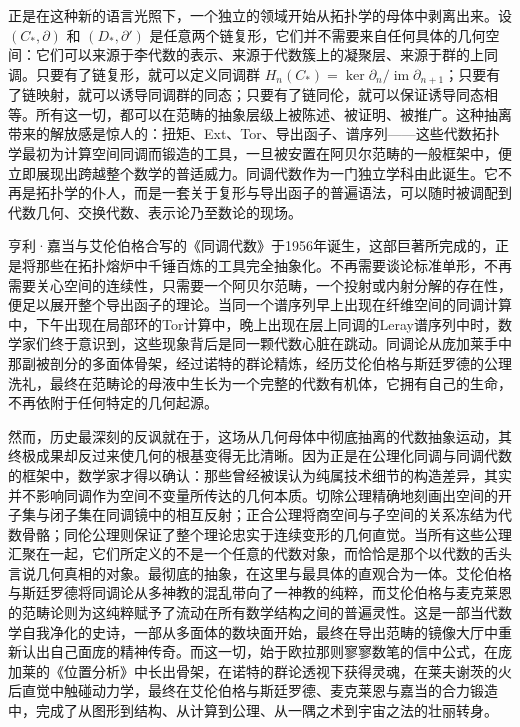 \documentclass[12pt,a4paper]{article}
\begin{document}
正是在这种新的语言光照下，一个独立的领域开始从拓扑学的母体中剥离出来。设 $(C_*, \partial)$ 和 $(D_*, \partial')$ 是任意两个链复形，它们并不需要来自任何具体的几何空间：它们可以来源于李代数的表示、来源于代数簇上的凝聚层、来源于群的上同调。只要有了链复形，就可以定义同调群 $H_n(C_*) = \ker \partial_n / \operatorname{im} \partial_{n+1}$；只要有了链映射，就可以诱导同调群的同态；只要有了链同伦，就可以保证诱导同态相等。所有这一切，都可以在范畴的抽象层级上被陈述、被证明、被推广。这种抽离带来的解放感是惊人的：扭矩、Ext、Tor、导出函子、谱序列——这些代数拓扑学最初为计算空间同调而锻造的工具，一旦被安置在阿贝尔范畴的一般框架中，便立即展现出跨越整个数学的普适威力。同调代数作为一门独立学科由此诞生。它不再是拓扑学的仆人，而是一套关于复形与导出函子的普遍语法，可以随时被调配到代数几何、交换代数、表示论乃至数论的现场。

亨利·嘉当与艾伦伯格合写的《同调代数》于1956年诞生，这部巨著所完成的，正是将那些在拓扑熔炉中千锤百炼的工具完全抽象化。不再需要谈论标准单形，不再需要关心空间的连续性，只需要一个阿贝尔范畴，一个投射或内射分解的存在性，便足以展开整个导出函子的理论。当同一个谱序列早上出现在纤维空间的同调计算中，下午出现在局部环的Tor计算中，晚上出现在层上同调的Leray谱序列中时，数学家们终于意识到，这些现象背后是同一颗代数心脏在跳动。同调论从庞加莱手中那副被剖分的多面体骨架，经过诺特的群论精炼，经历艾伦伯格与斯廷罗德的公理洗礼，最终在范畴论的母液中生长为一个完整的代数有机体，它拥有自己的生命，不再依附于任何特定的几何起源。

然而，历史最深刻的反讽就在于，这场从几何母体中彻底抽离的代数抽象运动，其终极成果却反过来使几何的根基变得无比清晰。因为正是在公理化同调与同调代数的框架中，数学家才得以确认：那些曾经被误认为纯属技术细节的构造差异，其实并不影响同调作为空间不变量所传达的几何本质。切除公理精确地刻画出空间的开子集与闭子集在同调镜中的相互反射；正合公理将商空间与子空间的关系冻结为代数骨骼；同伦公理则保证了整个理论忠实于连续变形的几何直觉。当所有这些公理汇聚在一起，它们所定义的不是一个任意的代数对象，而恰恰是那个以代数的舌头言说几何真相的对象。最彻底的抽象，在这里与最具体的直观合为一体。艾伦伯格与斯廷罗德将同调论从多神教的混乱带向了一神教的纯粹，而艾伦伯格与麦克莱恩的范畴论则为这纯粹赋予了流动在所有数学结构之间的普遍灵性。这是一部当代数学自我净化的史诗，一部从多面体的数块面开始，最终在导出范畴的镜像大厅中重新认出自己面庞的精神传奇。而这一切，始于欧拉那则寥寥数笔的信中公式，在庞加莱的《位置分析》中长出骨架，在诺特的群论透视下获得灵魂，在莱夫谢茨的火后直觉中触碰动力学，最终在艾伦伯格与斯廷罗德、麦克莱恩与嘉当的合力锻造中，完成了从图形到结构、从计算到公理、从一隅之术到宇宙之法的壮丽转身。
\end{document}
